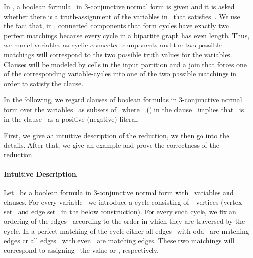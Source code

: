  In \ptSATs{}, a boolean formula~ in 3-conjunctive normal form is given and it is asked whether there is a truth-assignment of the variables in~ that satisfies~. We use the fact that, in \pCBMs{}, connected components that form cycles have exactly two perfect matchings because every cycle in a bipartite graph has even length. Thus, we model variables as cyclic connected components and the two possible matchings will correspond to the two possible truth values for the variables. Clauses will be modeled by cells in the input partition and a join that forces one of the corresponding variable-cycles into one of the two possible matchings in order to satisfy the clause. 

In the following, we regard clauses of boolean formulas in 3-conjunctive normal form over the variables~ as subsets of~ where~~() in the clause~ implies that~ is in the clause~ as a positive (negative) literal.

First, we give an intuitive description of the reduction, we then go into the details. After that, we give an example and prove the correctness of the reduction.

\paragraph{Intuitive Description.} Let~ be a boolean formula in 3-conjunctive normal form with~ variables and~ clauses. For every variable~ we introduce a cycle consisting of~~vertices (vertex set~ and edge set~ in the below construction). For every such cycle, we fix an ordering of the edges~ according to the order in which they are traversed by the cycle. In a perfect matching of the cycle either all edges~ with odd~ are matching edges or all edges~ with even~ are matching edges. These two matchings will correspond to assigning~ the value  or , respectively.

